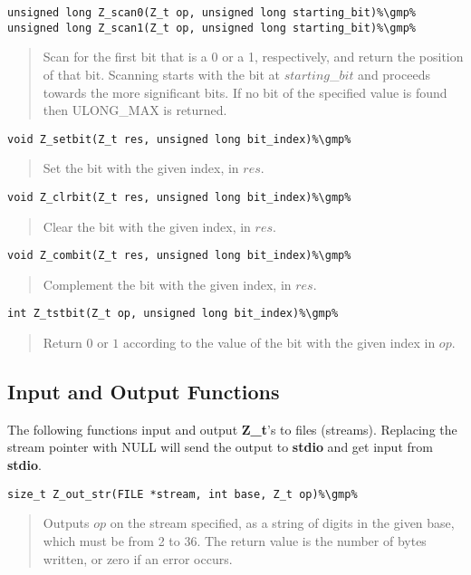 \documentclass[a4paper,10pt]{article}
\newcommand{\gmp}{\hfill[GMP]}
\begin{document}
\begin{lstlisting}
unsigned long Z_scan0(Z_t op, unsigned long starting_bit)%\gmp%
unsigned long Z_scan1(Z_t op, unsigned long starting_bit)%\gmp%
\end{lstlisting}
\begin{quote}Scan for the first bit that is a 0 or a 1, respectively, and return the position of that bit. Scanning starts with the bit at $starting$\_$bit$ and proceeds towards the more significant bits. If no bit of the specified value is found then ULONG\_MAX is returned.\end{quote}

\begin{lstlisting}
void Z_setbit(Z_t res, unsigned long bit_index)%\gmp%
\end{lstlisting}
\begin{quote}Set the bit with the given index, in $res$.\end{quote}

\begin{lstlisting}
void Z_clrbit(Z_t res, unsigned long bit_index)%\gmp%
\end{lstlisting}
\begin{quote}Clear the bit with the given index, in $res$.\end{quote}

\begin{lstlisting}
void Z_combit(Z_t res, unsigned long bit_index)%\gmp%
\end{lstlisting}
\begin{quote}Complement the bit with the given index, in $res$.\end{quote}

\begin{lstlisting}
int Z_tstbit(Z_t op, unsigned long bit_index)%\gmp%
\end{lstlisting}
\begin{quote}Return $0$ or $1$ according to the value of the bit with the given index in $op$.\end{quote}

\subsection{Input and Output Functions}
The following functions input and output \textbf{Z\_t}'s to files (streams). Replacing the stream pointer with NULL will send the output to \textbf{stdio} and get input from \textbf{stdio}.

\begin{lstlisting}
size_t Z_out_str(FILE *stream, int base, Z_t op)%\gmp%
\end{lstlisting}
\begin{quote}Outputs $op$ on the stream specified, as a string of digits in the given base, which must be from 2 to 36. The return value is the number of bytes written, or zero if an error occurs.\end{quote}
\end{document}
